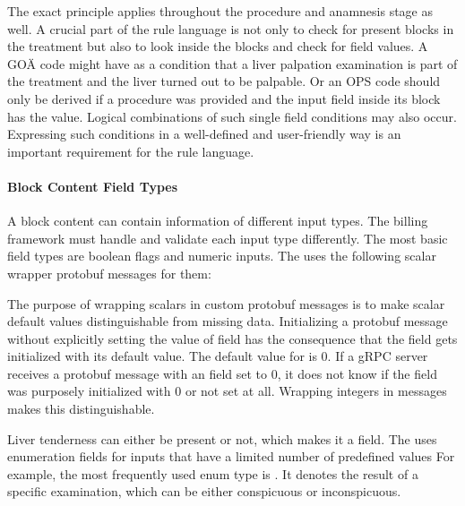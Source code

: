 The exact principle applies throughout the procedure and anamnesis stage as well.
A crucial part of the rule language is not only to check for present blocks in the treatment
but also to look inside the blocks and check for field values.
A GOÄ code might have as a condition that a liver palpation examination is part of the treatment and
the liver turned out to be palpable.
Or an OPS code should only be derived if a  procedure was provided and the
input field  inside its block has the value.
Logical combinations of such single field conditions may also occur.
Expressing such conditions in a well-defined and user-friendly way is an important requirement for the rule language.

\paragraph{Block Content Field Types}
A block content can contain information of different input types.
The billing framework must handle and validate each input type differently.
The most basic field types are boolean flags and numeric inputs.
The \AVS uses the following scalar wrapper protobuf messages for them:



The purpose of wrapping scalars in custom protobuf messages is to make scalar default values distinguishable from missing data.
Initializing a protobuf message without explicitly setting the value of field has the consequence that the field gets initialized with its default value.
The default value for  is 0.
If a gRPC server receives a protobuf message with an  field set to 0, it does not know if the field was purposely initialized with 0 or not set at all.
Wrapping integers in  messages makes this distinguishable.

Liver tenderness can either be present or not, which makes it a  field.
The \AVS uses enumeration fields for inputs that have a limited number of predefined values
For example, the most frequently used enum type is .
It denotes the result of a specific examination, which can be either conspicuous or inconspicuous.



